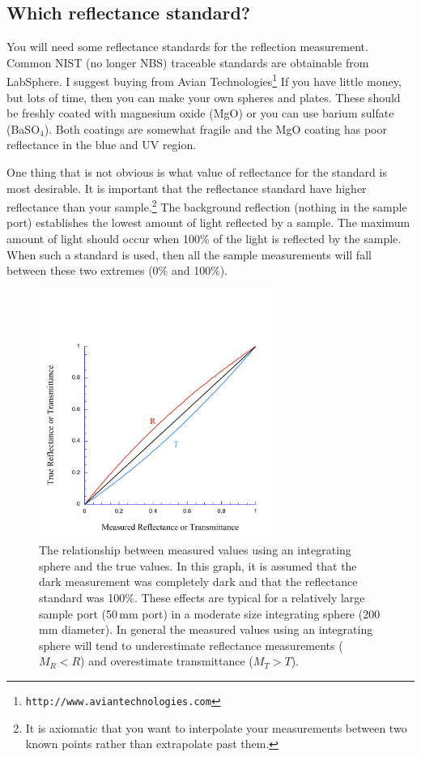 \documentclass{article}
\begin{document}
\subsection{Which reflectance standard?}

You will need some reflectance standards for the reflection measurement.  Common NIST (no longer NBS)
traceable standards are obtainable from LabSphere.  I suggest buying from
Avian Technologies\footnote{
\texttt{http://www.aviantechnologies.com}}
If you have little money, but lots of time, then you can make your
own spheres and plates.  These should be freshly coated with magnesium oxide
(MgO) or you can use barium sulfate (BaSO$_4$).  Both coatings are somewhat
fragile and the MgO coating has poor reflectance in the blue and UV region.

One thing that is not obvious is what value of reflectance for the standard
is most desirable.  It is important that the reflectance standard have higher
reflectance than your sample.\footnote{It is axiomatic that you want
to interpolate your measurements between two known points rather than
extrapolate past them.}  The background reflection (nothing in the sample port)
establishes the lowest amount of light reflected by a sample.  The maximum
amount of light should occur when 100\% of the light is reflected by the sample.
When such a standard is used, then all the sample measurements
will fall between these two extremes (0\% and 100\%).  

\begin{figure}[!t]
\centering
\includegraphics[width=3in]{ch3RTcorr.pdf}
\caption{The relationship between measured values using an integrating sphere
and the true values.  In this
graph, it is assumed that the dark measurement was completely dark and that
the reflectance standard was 100\%.  These effects are typical for a relatively
large sample port (50\,mm port) in a moderate size integrating sphere (200\,mm diameter).
In general the measured values using an integrating sphere will tend to underestimate reflectance measurements ($M_R<R$)
and overestimate transmittance ($M_T>T$).}
\label{spherecorr}
\end{figure}
\end{document}

